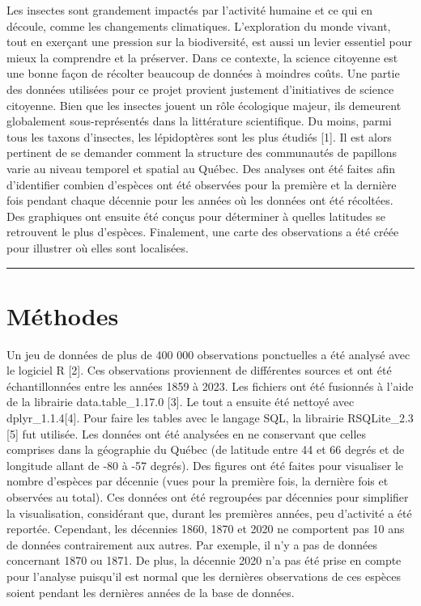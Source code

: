 \documentclass[preprint, 3p,
authoryear]{elsarticle} %
\begin{document}
Les insectes sont grandement impactés par l'activité humaine et ce qui
en découle, comme les changements climatiques. L'exploration du monde
vivant, tout en exerçant une pression sur la biodiversité, est aussi un
levier essentiel pour mieux la comprendre et la préserver. Dans ce
contexte, la science citoyenne est une bonne façon de récolter beaucoup
de données à moindres coûts. Une partie des données utilisées pour ce
projet provient justement d'initiatives de science citoyenne. Bien que
les insectes jouent un rôle écologique majeur, ils demeurent globalement
sous-représentés dans la littérature scientifique. Du moins, parmi tous
les taxons d'insectes, les lépidoptères sont les plus étudiés {[}1{]}.
Il est alors pertinent de se demander comment la structure des
communautés de papillons varie au niveau temporel et spatial au Québec.
Des analyses ont été faites afin d'identifier combien d'espèces ont été
observées pour la première et la dernière fois pendant chaque décennie
pour les années où les données ont été récoltées. Des graphiques ont
ensuite été conçus pour déterminer à quelles latitudes se retrouvent le
plus d'espèces. Finalement, une carte des observations a été créée pour
illustrer où elles sont localisées.

\begin{center}\rule{0.5\linewidth}{0.5pt}\end{center}

\section{Méthodes}\label{muxe9thodes}

Un jeu de données de plus de 400 000 observations ponctuelles a été
analysé avec le logiciel R {[}2{]}. Ces observations proviennent de
différentes sources et ont été échantillonnées entre les années 1859 à
2023. Les fichiers ont été fusionnés à l'aide de la librairie
data.table\_1.17.0 {[}3{]}. Le tout a ensuite été nettoyé avec
dplyr\_1.1.4{[}4{]}. Pour faire les tables avec le langage SQL, la
librairie RSQLite\_2.3 {[}5{]} fut utilisée. Les données ont été
analysées en ne conservant que celles comprises dans la géographie du
Québec (de latitude entre 44 et 66 degrés et de longitude allant de -80
à -57 degrés). Des figures ont été faites pour visualiser le nombre
d'espèces par décennie (vues pour la première fois, la dernière fois et
observées au total). Ces données ont été regroupées par décennies pour
simplifier la visualisation, considérant que, durant les premières
années, peu d'activité a été reportée. Cependant, les décennies 1860,
1870 et 2020 ne comportent pas 10 ans de données contrairement aux
autres. Par exemple, il n'y a pas de données concernant 1870 ou 1871. De
plus, la décennie 2020 n'a pas été prise en compte pour l'analyse
puisqu'il est normal que les dernières observations de ces espèces
soient pendant les dernières années de la base de données.
\end{document}
